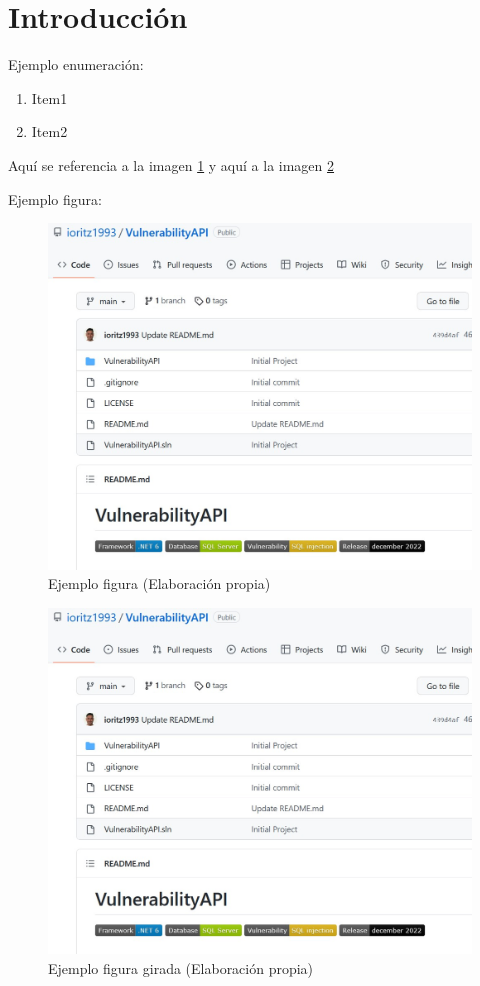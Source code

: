 \section{Introducción}
Ejemplo enumeración:
\begin{enumerate}
	\item Item1
	\item Item2
\end{enumerate}
Aquí se referencia a la imagen \ref{prueba} y aquí a la imagen \ref{prueba_invertida}

Ejemplo figura:
\begin{figure}[h]
	\centering
	\includegraphics[width=160mm]{includes/ejemplo_figura.jpg}
	\caption[Ejemplo figura]{Ejemplo figura (Elaboración propia)}
	\label{prueba}
\end{figure} 

\begin{figure}[h]
	\centering
	\includegraphics[width=160mm, angle=180]{includes/ejemplo_figura.jpg}
	\caption[Ejemplo figura girada]{Ejemplo figura girada (Elaboración propia)}
	\label{prueba_invertida}
\end{figure} 


